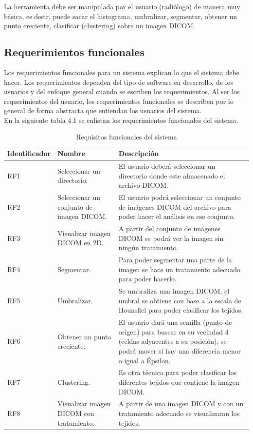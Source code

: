 \documentclass[12pt]{report}
\begin{document}
La herramienta debe ser manipulada por el usuario (radiólogo) de manera muy básica, es decir, puede sacar el histograma, umbralizar, segmentar, obtener un punto creciente, clasificar (clustering) sobre un imagen DICOM.
\subsection{Requerimientos funcionales}
Los requerimientos funcionales para un sistema explican lo que el sistema debe hacer. Los requerimientos dependen del tipo de software en desarrollo, de los usuarios y del enfoque general cuando se escriben los requerimientos. Al ser los requerimientos del usuario, los requerimientos funcionales se describen por lo general de forma abstracta que entiendan los usuarios del sistema. \cite{isRF}\\ 

En la siguiente tabla 4.1 se enlistan los requerimientos funcionales del sistema.\\ 

\begin{table}[H]
\begin{center}
\begin{tabular}{|p{23mm}|p{35mm}|p{75mm}|}
\hline
 Identificador & Nombre & Descripción \\
\hline \hline 
RF1 & Seleccionar un directorio. & El usuario deberá seleccionar un directorio donde este almacenado el archivo DICOM.\\
\hline
RF2 & Seleccionar un conjunto de imagen DICOM. & El usuario podrá seleccionar un conjunto de imágenes DICOM del archivo para poder hacer el análisis en ese conjunto.  \\
\hline
RF3 & Visualizar imagen DICOM en 2D. & A partir del conjunto de imágenes DICOM se podrá ver la imagen sin ningún tratamiento.  \\
\hline
RF4 & Segmentar. & Para poder segmentar una parte de la imagen se hace un tratamiento adecuado para poder hacerlo.  \\
\hline
RF5 & Umbralizar. & Se umbraliza una imagen DICOM, el umbral se obtiene con base a la escala de Hounsfiel para poder clasificar los tejidos.  \\
\hline
RF6 & Obtener un punto creciente. & El usuario dará una semilla (punto de origen) para buscar en su vecindad 4 (celdas adyacentes a su posición), se podrá mover si hay una diferencia menor o igual a Épsilon. \\
\hline
RF7 & Clustering. & Es otra técnica para poder clasificar los diferentes tejidos que contiene la imagen DICOM. \\
\hline
RF8 & Visualizar imagen DICOM con tratamiento. & A partir de una imagen DICOM y con un tratamiento adecuado se visualizaran los tejidos.\\
\hline
\end{tabular}
\caption{Requisitos funcionales del sistema}
\end{center}
\end{table}
\end{document}

